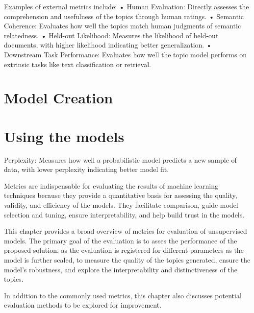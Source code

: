 Examples of external metrics include:
• Human Evaluation: Directly assesses the comprehension and usefulness of the topics through human ratings.
• Semantic Coherence: Evaluates how well the topics match human judgments of semantic relatedness.
• Held-out Likelihood: Measures the likelihood of held-out documents, with higher likelihood indicating better generalization.
• Downstream Task Performance: Evaluates how well the topic model performs on extrinsic tasks like text classification or retrieval.



\section{Model Creation}
\section{Using the models}
Perplexity: Measures how well a probabilistic model predicts a new sample of data, with
lower perplexity indicating better model fit.


Metrics are indispensable for evaluating the results of machine learning techniques because they provide a quantitative basis for assessing the quality, validity, and efficiency of the models. They facilitate comparison, guide model selection and tuning, ensure interpretability, and help build trust in the models. 

This chapter provides a broad overview of metrics for evaluation of unsupervised models. The primary goal of the evaluation is to asses the performance of the proposed solution, as the evaluation is registered for different parameters as the model is further scaled, to measure the quality of the topics generated, ensure the model's robustness, and explore the interpretability and distinctiveness of the topics. 


In addition to the commonly used metrics, this chapter also discusses potential evaluation methods to be explored for improvement.

